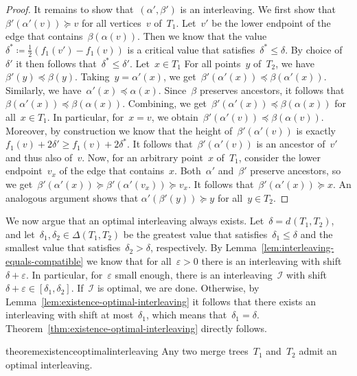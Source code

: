 \documentclass[a4paper,UKenglish, autoref, thm-restate, cleveref]{lipics-v2021}
\newcommand{\intdist}[1]{d^{{#1}}}
\newcommand{\eps}{\varepsilon}
\newcommand{\I}{\mathcal{I}}
\begin{document}
\begin{proof}
    It remains to show that~$(\alpha', \beta')$ is an interleaving.
	We first show that~$\beta'(\alpha'(v)) \succeq v$ for all vertices~$v$ of~$T_1$.
	Let~$v'$ be the lower endpoint of the edge that contains~$\beta(\alpha(v))$.
	Then we know that the value~$\delta^* \coloneqq \tfrac{1}{2}(f_1(v') - f_1(v))$ is a critical value that satisfies~$\delta^* \le \delta$.
	By choice of~$\delta'$ it then follows that~$\delta^* \le \delta'$.
    Let~$x \in T_1$
    For all points~$y$ of~$T_2$, we have~$\beta'(y) \preceq \beta(y)$.
    Taking~$y = \alpha'(x)$, we get~$\beta'(\alpha'(x)) \preceq \beta(\alpha'(x))$.
    Similarly, we have~$\alpha'(x) \preceq \alpha(x)$.
    Since~$\beta$ preserves ancestors, it follows that~$\beta(\alpha'(x)) \preceq \beta(\alpha(x))$.
    Combining, we get~$\beta'(\alpha'(x)) \preceq \beta(\alpha(x))$ for all~$x \in T_1$.
	In particular, for~$x = v$, we obtain~$\beta'(\alpha'(v)) \preceq \beta(\alpha(v))$.
	Moreover, by construction we know that the height of~$\beta'(\alpha'(v))$ is exactly~$f_1(v) + 2\delta' \ge f_1(v) + 2\delta^*$.
	It follows that~$\beta'(\alpha'(v))$ is an ancestor of~$v'$ and thus also of~$v$.
	Now, for an arbitrary point~$x$ of~$T_1$, consider the lower endpoint~$v_x$ of the edge that contains~$x$.
	Both~$\alpha'$ and~$\beta'$ preserve ancestors, so we get~$\beta'(\alpha'(x)) \succeq \beta'(\alpha'(v_x)) \succeq v_x$. 
	It follows that~$\beta'(\alpha'(x)) \succeq x$.
	An analogous argument shows that $\alpha'(\beta'(y)) \succeq y$ for all~$y \in T_2$.
\end{proof}

\noindent
We now argue that an optimal interleaving always exists.
Let~$\delta = \intdist{}(T_1, T_2)$, and let~$\delta_1, \delta_2 \in \Delta(T_1, T_2)$ be the greatest value that satisfies~$\delta_1 \le \delta$ and the smallest value that satisfies~$\delta_2 > \delta$, respectively.
By Lemma~\ref{lem:interleaving-equals-compatible} we know that for all~$\eps > 0$ there is an interleaving with shift~$\delta + \eps$.
In particular, for~$\eps$ small enough, there is an interleaving~$\I$ with shift~$\delta + \eps \in [\delta_1, \delta_2]$.
If~$\I$ is optimal, we are done.
Otherwise, by Lemma~\ref{lem:existence-optimal-interleaving} it follows that there exists an interleaving with shift at most~$\delta_1$, which means that~$\delta_1 = \delta$.
Theorem~\ref{thm:existence-optimal-interleaving} directly follows.

\begin{restatable}{theorem}{existenceoptimalinterleaving}
\label{thm:existence-optimal-interleaving}
	Any two merge trees~$T_1$ and~$T_2$ admit an optimal interleaving.
\end{restatable}
\end{document}
